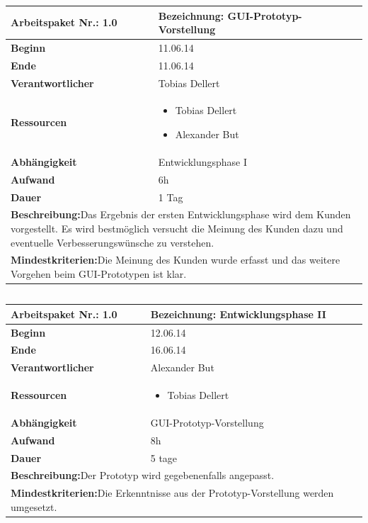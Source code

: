 \documentclass[fontsize=12pt,paper=a4,twoside]{scrartcl}
\begin{document}
\begin{tabular}{|p{5.3cm}|p{9.7cm}|}\hline
	\textbf{Arbeitspaket Nr.:} 1.0 & \textbf{Bezeichnung:} GUI-Prototyp-Vorstellung\\ \hline \hline
	\textbf{Beginn} & 11.06.14\\ \hline
	\textbf{Ende} &11.06.14\\ \hline
	\textbf{Verantwortlicher} & Tobias Dellert\\ \hline
	\textbf{Ressourcen} & \begin{itemize}
		\item Tobias Dellert
		\item Alexander But
	\end{itemize}    \\ \hline
	\textbf{Abhängigkeit} & Entwicklungsphase I\\ \hline
	\textbf{Aufwand} & 6h\\ \hline
	\textbf{Dauer} & 1 Tag\\ \hline
	\multicolumn{2}{|p{15cm}|}{\textbf{Beschreibung:}\newline  Das Ergebnis der ersten Entwicklungsphase wird dem Kunden vorgestellt. Es wird bestmöglich versucht die Meinung des Kunden dazu und eventuelle Verbesserungswünsche zu verstehen. }\\ \hline
	\multicolumn{2}{|p{15cm}|}{\textbf{Mindestkriterien:}\newline Die Meinung des Kunden wurde erfasst und das weitere Vorgehen beim GUI-Prototypen ist klar.}\\ \hline
	
\end{tabular}
\begin{verbatim} 

\end{verbatim}
\begin{tabular}{|p{5.3cm}|p{9.7cm}|}\hline
	\textbf{Arbeitspaket Nr.:} 1.0 & \textbf{Bezeichnung:} Entwicklungsphase II\\ \hline \hline
	\textbf{Beginn} & 12.06.14\\ \hline
	\textbf{Ende} & 16.06.14\\ \hline
	\textbf{Verantwortlicher} & Alexander But\\ \hline
	\textbf{Ressourcen} & \begin{itemize}
		\item Tobias Dellert
	\end{itemize}    \\ \hline
	\textbf{Abhängigkeit} & GUI-Prototyp-Vorstellung\\ \hline
	\textbf{Aufwand} & 8h\\ \hline
	\textbf{Dauer} & 5 tage\\ \hline
	\multicolumn{2}{|p{15cm}|}{\textbf{Beschreibung:}\newline  Der Prototyp wird gegebenenfalls angepasst. }\\ \hline
	\multicolumn{2}{|p{15cm}|}{\textbf{Mindestkriterien:}\newline Die Erkenntnisse aus der Prototyp-Vorstellung werden umgesetzt.}\\ \hline
\end{tabular}
\end{document}
